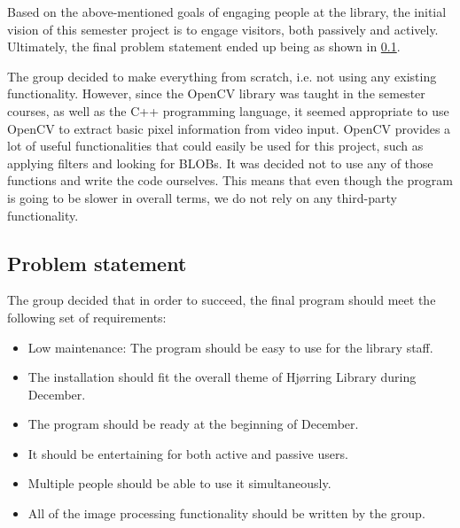 Based on the above-mentioned goals of engaging people at the library, the initial vision of this semester project is to engage visitors, both passively and actively. Ultimately, the final problem statement ended up being as shown in \ref{problemStatement}.

The group decided to make everything from scratch, i.e. not using any existing functionality. However, since the OpenCV library was taught in the semester courses, as well as the C++ programming language, it seemed appropriate to use OpenCV to extract basic pixel information from video input. OpenCV provides a lot of useful functionalities that could easily be used for this project, such as applying filters and looking for BLOBs. It was decided not to use any of those functions and write the code ourselves. This means that even though the program is going to be slower in overall terms, we do not rely on any third-party functionality.

\subsection{Problem statement}\label{problemStatement}
The group decided that in order to succeed, the final program should meet the following set of requirements:

\begin{itemize}
\item Low maintenance: The program should be easy to use for the library staff.
\item The installation should fit the overall theme of Hj{\o}rring Library during December.
\item The program should be ready at the beginning of December.
\item It should be entertaining for both active and passive users.
\item Multiple people should be able to use it simultaneously.
\item All of the image processing functionality should be written by the group.
\end{itemize}